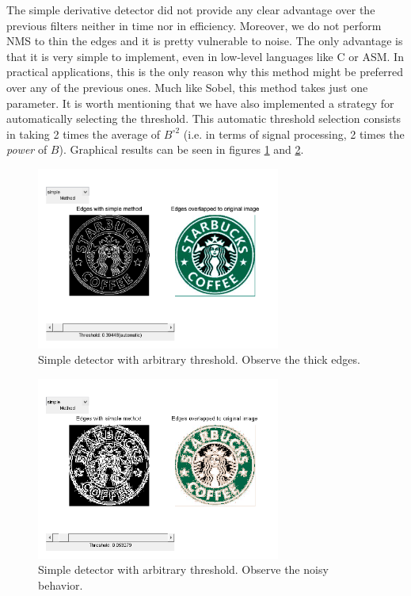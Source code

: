 The simple derivative detector did not provide any clear advantage over the previous filters neither
in time nor in efficiency. Moreover, we do not perform NMS to thin the edges and it is pretty vulnerable to noise. The only advantage is that it is very simple to implement, even in low-level languages like C or ASM. In practical applications, this is the only reason why this
method might be preferred over any of the previous ones. Much like Sobel, this method takes just
one parameter. It is worth mentioning that we have also implemented a strategy for automatically
selecting the threshold. This automatic threshold selection consists in taking 2 times the
average of $B^{\circ2}$ (i.e. in terms of signal processing, 2 times the \emph{power} of $B$).
Graphical results can be seen in figures \ref{fig:simplegui} and \ref{fig:simpleguinoisy}.

\begin{figure}
	\centering
	\includegraphics[height=6cm]{./img/ex1/simplegui.png}
	\caption{Simple detector with arbitrary threshold. Observe the thick edges.}
	\label{fig:simplegui}
\end{figure}

\begin{figure}
	\centering
	\includegraphics[height=6cm]{./img/ex1/simpleguinoisy.png}
	\caption{Simple detector with arbitrary threshold. Observe the noisy behavior.}
	\label{fig:simpleguinoisy}
\end{figure}

